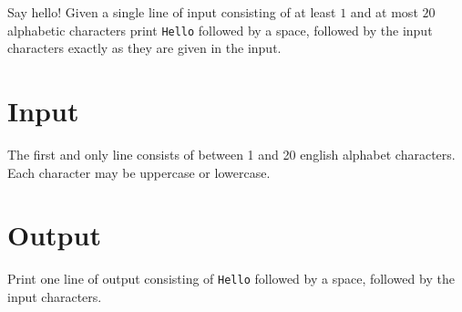 Say hello! Given a single line of input consisting of at least $1$ and at most $20$
alphabetic characters print \texttt{Hello} followed by a space, followed by the input
characters exactly as they are given in the input.

\section*{Input}
The first and only line consists of between 1 and 20 english alphabet characters.
Each character may be uppercase or lowercase.

\section*{Output}
Print one line of output consisting of \texttt{Hello} followed by a space, followed by
the input characters.
